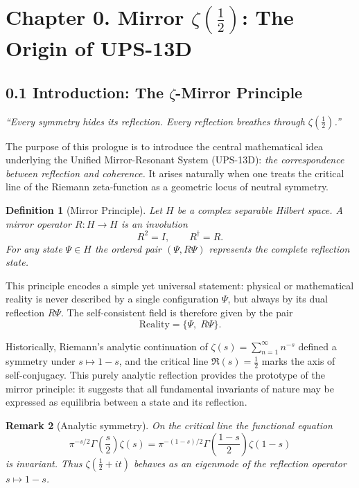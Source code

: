\documentclass[11pt]{amsart}
\numberwithin{equation}{section}
\newtheorem{definition}{Definition}[section]
\newtheorem{remark}[definition]{Remark}
\begin{document}
\section*{Chapter 0. Mirror $\zeta(\tfrac12)$: The Origin of UPS-13D}

\subsection*{0.1 Introduction: The $\zeta$-Mirror Principle}

\begin{flushright}
\textit{“Every symmetry hides its reflection.  
Every reflection breathes through $\zeta(\tfrac12)$.”}
\end{flushright}

\medskip
The purpose of this prologue is to introduce the central mathematical idea 
underlying the Unified Mirror-Resonant System (UPS-13D):  
\emph{the correspondence between reflection and coherence.}  
It arises naturally when one treats the critical line of the Riemann zeta-function
as a geometric locus of neutral symmetry.

\begin{definition}[Mirror Principle]\label{def:mirror_principle}
Let \(H\) be a complex separable Hilbert space.
A \emph{mirror operator} \(R\colon H\!\to\!H\) is an involution
\[
R^2 = I,\qquad R^\dagger = R.
\]
For any state \(\Psi\in H\) the ordered pair \((\Psi, R\Psi)\) represents the 
\emph{complete reflection state}.
\end{definition}

This principle encodes a simple yet universal statement:
physical or mathematical reality is never described by a single configuration 
\(\Psi\), but always by its dual reflection \(R\Psi\).
The self-consistent field is therefore given by the pair
\[
\text{Reality} = \{\Psi,\; R\Psi\}.
\]

Historically, Riemann’s analytic continuation of 
\(\zeta(s)=\sum_{n=1}^\infty n^{-s}\)
defined a symmetry under \(s\mapsto1-s\),  
and the critical line \(\Re(s)=\tfrac12\) marks the axis of self-conjugacy.
This purely analytic reflection provides the prototype of the mirror principle:
it suggests that all fundamental invariants of nature
may be expressed as equilibria between a state and its reflection.

\begin{remark}[Analytic symmetry]\label{rem:analytic_symmetry}
On the critical line the functional equation
\[
\pi^{-s/2}\Gamma\!\left(\frac{s}{2}\right)\zeta(s)
   =\pi^{-(1-s)/2}\Gamma\!\left(\frac{1-s}{2}\right)\zeta(1-s)
\]
is invariant.  
Thus \(\zeta(\tfrac12+it)\) behaves as an eigenmode of the reflection operator
\(s\mapsto1-s\).
\end{remark}
\end{document}
